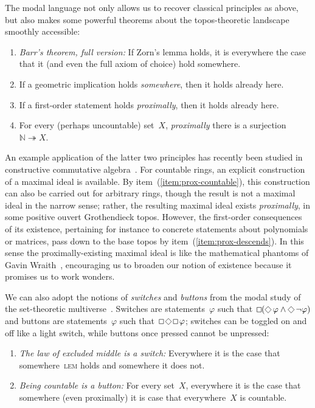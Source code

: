 \documentclass[oneside,reqno]{amsart}
\theoremstyle{definition}
\theoremstyle{plain}
\theoremstyle{remark}
\newcommand{\NN}{\mathbb{N}}
\renewcommand{\_}{\mathpunct{.}\,}
\DeclareMathOperator{\possible}{\text{\tikz[scale=.6ex/1cm,baseline=-.6ex,rotate=45,line width=.1ex]{\draw (-1,-1) rectangle (1,1);}}}
\DeclareMathOperator{\necessary}{\text{\tikz[scale=.6ex/1cm,baseline=-.6ex,line width=.1ex]{\draw (-1,-1) rectangle (1,1);}}}
\newcommand{\?}{\,{:}\,}
\begin{document}
The modal language not only allows us to recover classical principles
as above, but also makes some powerful theorems about the topos-theoretic
landscape smoothly accessible:
\begin{enumerate}
\addtocounter{enumi}{7}
\item \emph{Barr's theorem, full version:} If Zorn's lemma holds, it is
everywhere the case that it (and even the full axiom of choice) hold somewhere.
\item If a geometric implication holds \emph{somewhere}, then it holds already here.
\item \label{item:prox-descends}
If a first-order statement holds \emph{proximally}, then it holds already here.
\item \label{item:prox-countable}
For every (perhaps uncountable) set~$X$, \emph{proximally} there is a
surjection~$\NN \twoheadrightarrow X$.
\end{enumerate}
An example application of the latter two principles
has recently been studied in constructive
commutative algebra~\cite{blechschmidt-schuster:constructive-maximal-ideals}.
For countable rings, an explicit construction of a maximal ideal is available.
By item~(\ref{item:prox-countable}), this construction can also be carried out
for arbitrary rings, though the result is not a maximal ideal in the narrow
sense; rather, the resulting maximal ideal exists \emph{proximally}, in some
positive ouvert Grothendieck topos. However, the first-order consequences of
its existence, pertaining for instance to concrete statements about polynomials
or matrices, pass down to the base topos by item~(\ref{item:prox-descends}).
In this sense the proximally-existing maximal ideal is like the mathematical
phantoms of Gavin Wraith~\cite{xxx}, encouraging us to broaden our notion of
existence because it promises us to work wonders.

We can also adopt the notions of \emph{switches} and \emph{buttons} from the
modal study of the set-theoretic multiverse~\cite[xxx]{xxx}. Switches are
statements~$\varphi$ such that~$\necessary(\possible\varphi \wedge
\possible\neg\varphi)$ and buttons are statements~$\varphi$ such
that~$\necessary\possible\necessary\varphi$; switches can be toggled on and off
like a light switch, while buttons once pressed cannot be unpressed:
\begin{enumerate}
\addtocounter{enumi}{10}
\item \emph{The law of excluded middle is a switch:} Everywhere it is the case
that somewhere~\textsc{lem} holds and somewhere it does not.
\item \emph{Being countable is a button:} For every set~$X$, everywhere it is
the case that somewhere (even proximally) it is case that everywhere~$X$ is
countable.
\end{enumerate}
\end{document}
